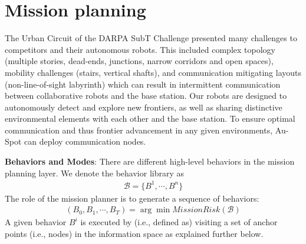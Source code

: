 \documentclass[letterpaper, 10pt, conference]{ieeeconf}      %
\newcommand{\ph}[1]{{\textbf{#1}:}} %
\newcommand{\todo}[1]{{\color{red} #1 }} %
\newcommand{\inst}[1]{{\color{orange} #1 }} %
\begin{document}

\section{Mission planning}\label{sec:mission_planning}


The Urban Circuit of the DARPA SubT Challenge presented many challenges to competitors and their autonomous robots. This included complex topology (multiple stories, dead-ends, junctions, narrow corridors and open spaces), mobility challenges (stairs, vertical shafts), and communication mitigating layouts (non-line-of-sight labyrinth) which can result in intermittent communication between collaborative robots and the base station. Our robots are designed to autonomously detect and explore new frontiers, as well as sharing distinctive environmental elements with each other and the base station. To ensure optimal communication and thus frontier advancement in any given environments, Au-Spot can deploy communication nodes.

\ph{Behaviors and Modes}
There are different high-level behaviors in the mission planning layer. 
We denote the behavior library as
\begin{align}
    \mathcal{B} = \{B^1,\cdots,B^n \}
\end{align}
The role of the mission planner is to generate a sequence of behaviors:
\begin{align}
    (B_0,B_1,\cdots,B_T) = \arg\min MissionRisk(\mathcal{B})
\end{align}
A given behavior $B^i$ is executed by (i.e., defined as) visiting a set of anchor points (i.e., nodes) in the information space as explained further below. 
\end{document}
